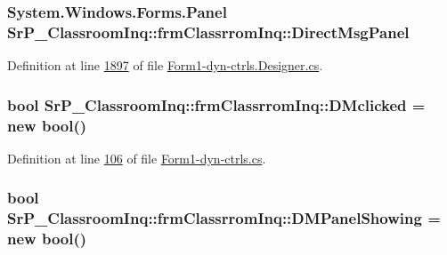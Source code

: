 \hypertarget{class_sr_p___classroom_inq_1_1frm_classrrom_inq_a3241f0f690675052aff4224bc4fabc3d}{
\subsubsection[{\-Direct\-Msg\-Panel}]{\setlength{\rightskip}{0pt plus 5cm}\-System.\-Windows.\-Forms.\-Panel {\bf \-Sr\-P\-\_\-\-Classroom\-Inq\-::frm\-Classrrom\-Inq\-::\-Direct\-Msg\-Panel}}}
\label{class_sr_p___classroom_inq_1_1frm_classrrom_inq_a3241f0f690675052aff4224bc4fabc3d}


\-Definition at line \hyperlink{_form1-dyn-ctrls_8_designer_8cs_source_l01897}{1897} of file \hyperlink{_form1-dyn-ctrls_8_designer_8cs_source}{\-Form1-\/dyn-\/ctrls.\-Designer.\-cs}.

\hypertarget{class_sr_p___classroom_inq_1_1frm_classrrom_inq_a663c3385393ae39a41bd647632ba4617}{
\subsubsection[{\-D\-Mclicked}]{\setlength{\rightskip}{0pt plus 5cm}bool {\bf \-Sr\-P\-\_\-\-Classroom\-Inq\-::frm\-Classrrom\-Inq\-::\-D\-Mclicked} = new bool()}}
\label{class_sr_p___classroom_inq_1_1frm_classrrom_inq_a663c3385393ae39a41bd647632ba4617}


\-Definition at line \hyperlink{_form1-dyn-ctrls_8cs_source_l00106}{106} of file \hyperlink{_form1-dyn-ctrls_8cs_source}{\-Form1-\/dyn-\/ctrls.\-cs}.

\hypertarget{class_sr_p___classroom_inq_1_1frm_classrrom_inq_a7a4d3ad70d4284ad3f7d8ab3ca8718e0}{
\subsubsection[{\-D\-M\-Panel\-Showing}]{\setlength{\rightskip}{0pt plus 5cm}bool {\bf \-Sr\-P\-\_\-\-Classroom\-Inq\-::frm\-Classrrom\-Inq\-::\-D\-M\-Panel\-Showing} = new bool()}}
\label{class_sr_p___classroom_inq_1_1frm_classrrom_inq_a7a4d3ad70d4284ad3f7d8ab3ca8718e0}


